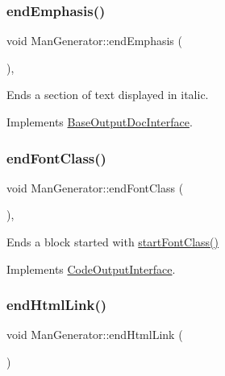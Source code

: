 \subsubsection{\texorpdfstring{endEmphasis()}{endEmphasis()}}
{\footnotesize\ttfamily void Man\+Generator\+::end\+Emphasis (\begin{DoxyParamCaption}{ }\end{DoxyParamCaption})\hspace{0.3cm}{\ttfamily [inline]}, {\ttfamily [virtual]}}

Ends a section of text displayed in italic. 

Implements \mbox{\hyperlink{class_base_output_doc_interface_aed2cf04d82648509f97403bd4ce62590}{Base\+Output\+Doc\+Interface}}.

\mbox{\label{class_man_generator_a35a79c6fc4ee7bd9eeadb74181e368d1}} 
\subsubsection{\texorpdfstring{endFontClass()}{endFontClass()}}
{\footnotesize\ttfamily void Man\+Generator\+::end\+Font\+Class (\begin{DoxyParamCaption}{ }\end{DoxyParamCaption})\hspace{0.3cm}{\ttfamily [inline]}, {\ttfamily [virtual]}}

Ends a block started with \mbox{\hyperlink{class_man_generator_a4bafda26799458d289c507fad6690de9}{start\+Font\+Class()}} 

Implements \mbox{\hyperlink{class_code_output_interface_a2b8ac05a391dae36793aa3aa8714a0f6}{Code\+Output\+Interface}}.

\mbox{\label{class_man_generator_a7323695cedb872064ddb450875b2baea}} 
\subsubsection{\texorpdfstring{endHtmlLink()}{endHtmlLink()}}
{\footnotesize\ttfamily void Man\+Generator\+::end\+Html\+Link (\begin{DoxyParamCaption}{ }\end{DoxyParamCaption})\hspace{0.3cm}{\ttfamily [virtual]}}

